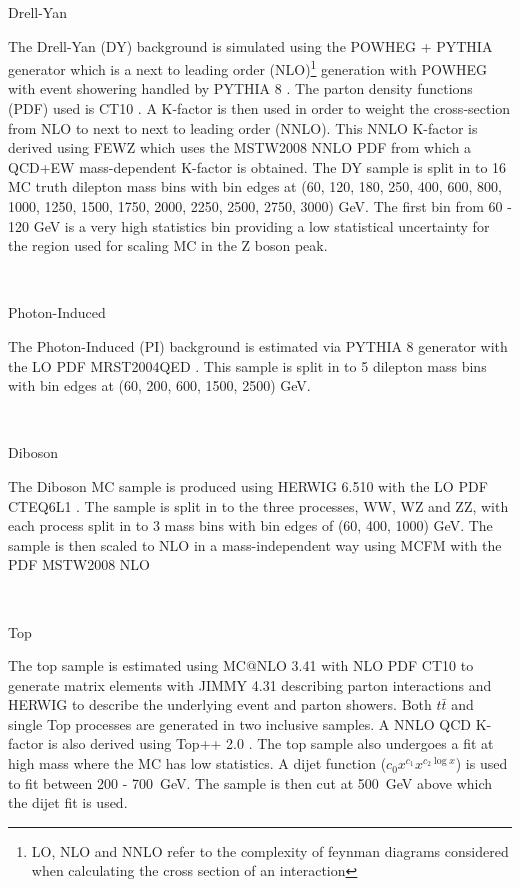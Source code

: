    {\bf\raggedright Drell-Yan}

   {\raggedright The Drell-Yan (DY) background is simulated using the POWHEG + PYTHIA generator which is a next to leading order (NLO)\footnote{LO, NLO and NNLO refer to the complexity of feynman diagrams considered when calculating the cross section of an interaction} generation with POWHEG \cite{Alioli:2010xd,Alioli:2008gx} with event showering handled by PYTHIA 8 \cite{Sjostrand:2007gs}. The parton density functions (PDF) used is CT10 \cite{Lai:2010vv}. A K-factor is then used in order to weight the cross-section from NLO to next to next to leading order (NNLO). This NNLO K-factor is derived using FEWZ \cite{Gavin:2010az} which uses the MSTW2008 NNLO PDF \cite{Martin:2009iq} from which a QCD+EW mass-dependent K-factor is obtained. The DY sample is split in to 16 MC truth dilepton mass bins with bin edges at (60, 120, 180, 250, 400, 600, 800, 1000, 1250, 1500, 1750, 2000, 2250, 2500, 2750, 3000) GeV. The first bin from 60 - 120 GeV is a very high statistics bin providing a low statistical uncertainty for the region used for scaling MC in the Z boson peak.} \\


   {\bf\raggedright Photon-Induced}

   {\raggedright The Photon-Induced (PI) background is estimated via PYTHIA 8 \cite{Sjostrand:2007gs} generator with the LO PDF MRST2004QED \cite{Martin:2004dh}. This sample is split in to 5 dilepton mass bins with bin edges at (60, 200, 600, 1500, 2500) GeV.}\\


   {\bf\raggedright Diboson}

   {\raggedright The Diboson MC sample is produced using HERWIG 6.510 \cite{Corcella:2002jc} with the LO PDF CTEQ6L1 \cite{Pumplin:2002vw}. The sample is split in to the three processes, WW, WZ and ZZ, with each process split in to 3 mass bins with bin edges of (60, 400, 1000) GeV. The sample is then scaled to NLO in a mass-independent way using MCFM \cite{Campbell:2010ff} with the PDF MSTW2008 NLO \cite{Martin:2009iq}}\\

   {\bf\raggedright Top}

   {\raggedright The top sample is estimated using MC@NLO 3.41 \cite{Frixione:2008ym} with NLO PDF CT10 \cite{Lai:2010vv} to generate matrix elements with JIMMY 4.31 \cite{Butterworth:1996zw} describing parton interactions and HERWIG \cite{Corcella:2002jc} to describe the underlying event and parton showers. Both $t\bar{t}$ and single Top processes are generated in two inclusive samples. A NNLO QCD K-factor is also derived using Top++ 2.0 \cite{Czakon:2013goa,Cacciari:2011hy}. The top sample also undergoes a fit at high mass where the MC has low statistics. A dijet function ($c_{0}x^{c_{1}} x^{c_{2}\log{x}}$) is used to fit between 200 - 700~GeV. The sample is then cut at 500~GeV above which the dijet fit is used.}



